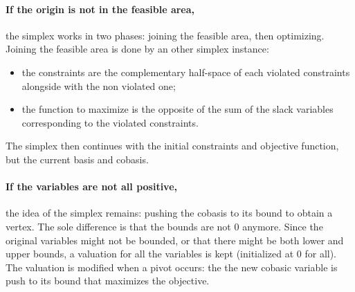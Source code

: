 \paragraph{If the origin is not in the feasible area,} the simplex works in two phases: joining the feasible area, then optimizing. Joining the feasible area is done by an other simplex instance: 
\vspace*{-0.1cm}
\begin{itemize}
\item the constraints are the complementary half-space of each violated constraints alongside with the non violated one;
\item the function to maximize is the opposite of the sum of the slack variables corresponding to the violated constraints.
\end{itemize}
\vspace*{-0.1cm}
The simplex then continues with the initial constraints and objective function, but the current basis and cobasis.

\paragraph{If the variables are not all positive,} the idea of the simplex remains: pushing the cobasis to its bound to obtain a vertex. The sole difference is that the bounds are not $0$ anymore. Since the original variables might not be bounded, or that there might be both lower and upper bounds, a valuation for all the variables is kept (initialized at $0$ for all). The valuation is modified when a pivot occurs: the the new cobasic variable is push to its bound that maximizes the objective.



